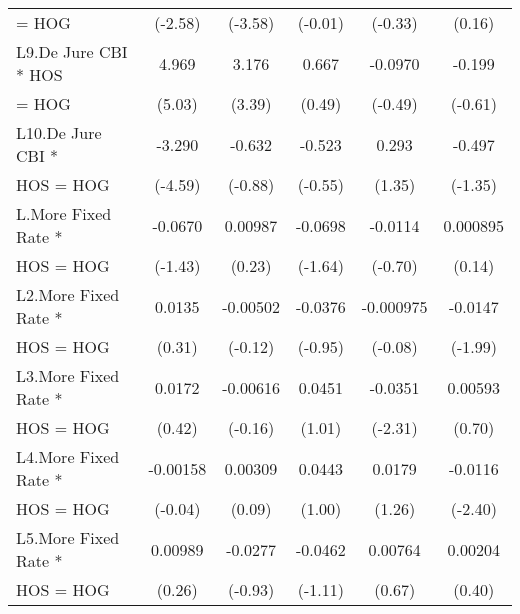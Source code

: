 {\begin{tabular}{l*{5}{c}}
= HOG               &     (-2.58)         &     (-3.58)         &     (-0.01)         &     (-0.33)         &      (0.16)         \\
[1em]
L9.De Jure CBI * HOS&       4.969\sym{***}&       3.176\sym{***}&       0.667         &     -0.0970         &      -0.199         \\
= HOG               &      (5.03)         &      (3.39)         &      (0.49)         &     (-0.49)         &     (-0.61)         \\
[1em]
L10.De Jure CBI *   &      -3.290\sym{***}&      -0.632         &      -0.523         &       0.293         &      -0.497         \\
HOS = HOG           &     (-4.59)         &     (-0.88)         &     (-0.55)         &      (1.35)         &     (-1.35)         \\
[1em]
L.More Fixed Rate * &     -0.0670         &     0.00987         &     -0.0698         &     -0.0114         &    0.000895         \\
HOS = HOG           &     (-1.43)         &      (0.23)         &     (-1.64)         &     (-0.70)         &      (0.14)         \\
[1em]
L2.More Fixed Rate *&      0.0135         &    -0.00502         &     -0.0376         &   -0.000975         &     -0.0147\sym{*}  \\
HOS = HOG           &      (0.31)         &     (-0.12)         &     (-0.95)         &     (-0.08)         &     (-1.99)         \\
[1em]
L3.More Fixed Rate *&      0.0172         &    -0.00616         &      0.0451         &     -0.0351\sym{*}  &     0.00593         \\
HOS = HOG           &      (0.42)         &     (-0.16)         &      (1.01)         &     (-2.31)         &      (0.70)         \\
[1em]
L4.More Fixed Rate *&    -0.00158         &     0.00309         &      0.0443         &      0.0179         &     -0.0116\sym{*}  \\
HOS = HOG           &     (-0.04)         &      (0.09)         &      (1.00)         &      (1.26)         &     (-2.40)         \\
[1em]
L5.More Fixed Rate *&     0.00989         &     -0.0277         &     -0.0462         &     0.00764         &     0.00204         \\
HOS = HOG           &      (0.26)         &     (-0.93)         &     (-1.11)         &      (0.67)         &      (0.40)         \\

\end{tabular}}

